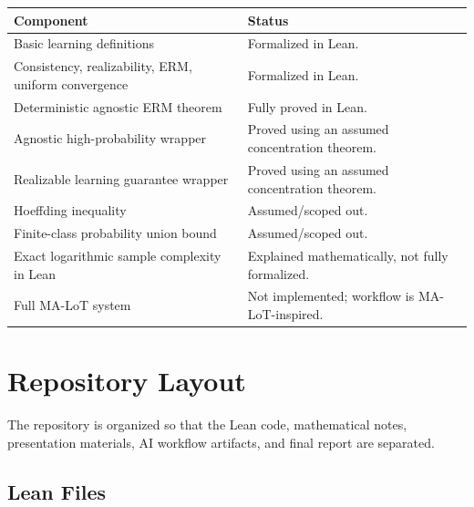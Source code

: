 \documentclass[11pt]{article}
\theoremstyle{definition}
\begin{document}
\begin{longtable}{>{\raggedright\arraybackslash}p{}
                  >{\raggedright\arraybackslash}p{}}
\toprule
\textbf{Component} & \textbf{Status} \\
\midrule
\endhead
Basic learning definitions & Formalized in Lean. \\
Consistency, realizability, ERM, uniform convergence & Formalized in Lean. \\
Deterministic agnostic ERM theorem & Fully proved in Lean. \\
Agnostic high-probability wrapper & Proved using an assumed concentration theorem. \\
Realizable learning guarantee wrapper & Proved using an assumed concentration theorem. \\
Hoeffding inequality & Assumed/scoped out. \\
Finite-class probability union bound & Assumed/scoped out. \\
Exact logarithmic sample complexity in Lean & Explained mathematically, not fully formalized. \\
Full MA-LoT system & Not implemented; workflow is MA-LoT-inspired. \\
\bottomrule
\end{longtable}

\section{Repository Layout}

The repository is organized so that the Lean code, mathematical notes,
presentation materials, AI workflow artifacts, and final report are separated.

\subsection{Lean Files}
\end{document}
